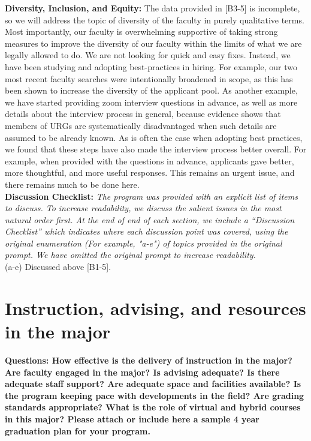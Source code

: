 \documentclass[12pt]{article}
\begin{document}
\noindent
{\bf Diversity, Inclusion, and Equity:} The data provided in [B3-5] is
incomplete, so we will address the topic of diversity of the faculty
in purely qualitative terms.  Most importantly, our faculty is
overwhelming supportive of taking strong measures to improve the
diversity of our faculty within the limits of what we are legally
allowed to do.  We are not looking for quick and easy fixes.  Instead,
we have been studying and adopting best-practices in hiring.  For
example, our two most recent faculty searches were intentionally
broadened in scope, as this has been shown to increase the diversity
of the applicant pool.  As another example, we have started providing
zoom interview questions in advance, as well as more details about the
interview process in general, because evidence shows that members of
URGs are systematically disadvantaged when such details are assumed to
be already known.  As is often the case when adopting best practices,
we found that these steps have also made the interview process better
overall. For example, when provided with the questions in advance,
applicants gave better, more thoughtful, and more useful responses.
This remains an urgent issue, and there remains much to be done
here.\\[3pt]

\noindent
{\bf Discussion Checklist:} 
{\it The program was provided with an
  explicit list of items to discuss.  To increase readability, we
  discuss the salient issues in the most natural order first.  At the
  end of end of each section, we include a ``Discussion Checklist'' which
  indicates where each discussion point was covered, using the
  original enumeration (For example, "a-e") of topics provided in the original
  prompt. We have omitted the original prompt to increase
  readability.}\\[3pt]
  (a-e) Discussed above [B1-5].\\[3pt]

\newpage
\section{Instruction, advising, and resources in the major}
\label{sec:instruction}

{\bf Questions: How effective is the delivery of instruction in the
  major? Are faculty engaged in the major? Is advising adequate? Is
  there adequate staff support? Are adequate space and facilities
  available? Is the program keeping pace with developments in the
  field? Are grading standards appropriate? What is the role of
  virtual and hybrid courses in this major? Please attach or include
  here a sample 4 year graduation plan for your program.}\\[3pt]
\end{document}
